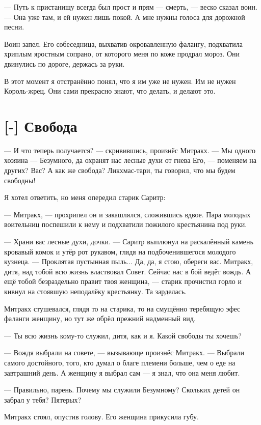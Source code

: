 --- Путь к пристанищу всегда был прост и прям --- смерть, --- веско сказал воин.
--- Она уже там, и ей нужен лишь покой.
А мне нужны голоса для дорожной песни.

Воин запел.
Его собеседница, выхватив окровавленную фалангу, подхватила хриплым яростным сопрано, от которого меня по коже продрал мороз.
Они двинулись по дороге, держась за руки.

В этот момент я отстранённо понял, что я им уже не нужен.
Им не нужен Король-жрец.
Они сами прекрасно знают, что делать, и делают это.

\section{[-] Свобода}

\textspace

--- И что теперь получается? --- скривившись, произнёс Митракх.
--- Мы одного хозяина --- Безумного, да охранят нас лесные духи от гнева Его, --- поменяем на других?
Вас?
А как же свобода?
Ликхмас-тари, ты говорил, что мы будем свободны!

Я хотел ответить, но меня опередил старик Саритр:

--- Митракх, --- прохрипел он и закашлялся, сложившись вдвое.
Пара молодых воительниц поспешили к нему и подхватили пожилого крестьянина под руки.

--- Храни вас лесные духи, дочки. --- Саритр выплюнул на раскалённый камень кровавый комок и утёр рот рукавом, глядя на подбоченившегося молодого кузнеца.
--- Проклятая пустынная пыль...
Да, да, я стою, обереги вас.
Митракх, дитя, над тобой всю жизнь властвовал Совет.
Сейчас нас в бой ведёт вождь.
А ещё тобой безраздельно правит твоя женщина, --- старик прочистил горло и кивнул на стоявшую неподалёку крестьянку.
Та зарделась.

Митракх стушевался, глядя то на старика, то на смущённо теребящую эфес фаланги женщину, но тут же обрёл прежний надменный вид.

--- Ты всю жизнь кому-то служил, дитя, как и я.
Какой свободы ты хочешь?

--- Вождя выбрали на совете, --- вызывающе произнёс Митракх.
--- Выбрали самого достойного, того, кто думал о благе племени больше, чем о еде на завтрашний день.
А женщину я выбрал сам --- я знал, что она меня любит.

--- Правильно, парень.
Почему мы служили Безумному?
Скольких детей он забрал у тебя?
Пятерых?

Митракх стоял, опустив голову.
Его женщина прикусила губу.

